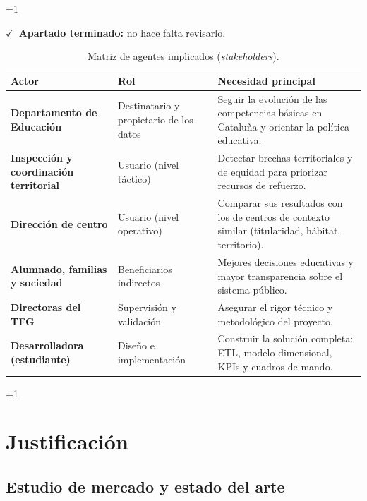 \documentclass[12pt, a4paper, oneside]{report}
\newcommand{\mostrarterminados}{1}
\newenvironment{revisado}
  {\ifnum\mostrarterminados=1\relax\begin{cajarevisada}\noindent\colorbox{verdeterminado}{\parbox{\dimexpr\linewidth-2\fboxsep\relax}{\small$\checkmark$\ \textbf{Apartado terminado:} no hace falta revisarlo.}}\par\medskip\fi}
  {\ifnum\mostrarterminados=1\relax\end{cajarevisada}\fi}
\begin{document}
\begin{revisado}
\begin{table}[H]
\centering
\small
\renewcommand{\arraystretch}{1.1}
\begin{tabularx}{\textwidth}{@{} p{3.6cm} p{3.6cm} X @{}}
\toprule
\textbf{Actor} & \textbf{Rol} & \textbf{Necesidad principal} \\ \midrule
\textbf{Departamento de Educación} & Destinatario y propietario de los datos & Seguir la evolución de las competencias básicas en Cataluña y orientar la política educativa. \\ \addlinespace
\textbf{Inspección y coordinación territorial} & Usuario (nivel táctico) & Detectar brechas territoriales y de equidad para priorizar recursos de refuerzo. \\ \addlinespace
\textbf{Dirección de centro} & Usuario (nivel operativo) & Comparar sus resultados con los de centros de contexto similar (titularidad, hábitat, territorio). \\ \addlinespace
\textbf{Alumnado, familias y sociedad} & Beneficiarios indirectos & Mejores decisiones educativas y mayor transparencia sobre el sistema público. \\ \addlinespace
\textbf{Directoras del TFG} & Supervisión y validación & Asegurar el rigor técnico y metodológico del proyecto. \\ \addlinespace
\textbf{Desarrolladora (estudiante)} & Diseño e implementación & Construir la solución completa: ETL, modelo dimensional, KPIs y cuadros de mando. \\ \bottomrule
\end{tabularx}
\caption{Matriz de agentes implicados (\textit{stakeholders}).}
\label{tab:stakeholders}
\end{table}
\end{revisado}

\chapter{Justificación}

\section{Estudio de mercado y estado del arte}
\label{sec:estado_arte}
\end{document}
